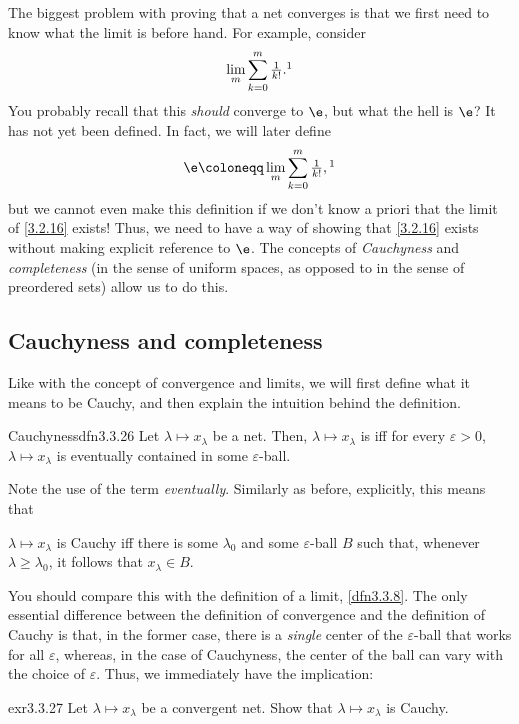 The biggest problem with proving that a net converges is that we first need to know what the limit is before hand.  For example, consider
\begin{equation}\label{3.2.16}
\lim _m\sum _{k=0}^m\tfrac{1}{k!}.\footnotemark
\end{equation}
You probably recall that this \emph{should} converge to $\e$, but what the hell is $\e$?  It has not yet been defined.  In fact, we will later define
\begin{equation}
\e \coloneqq \lim _m\sum _{k=0}^m\tfrac{1}{k!},\footnotemark
\end{equation}
but we cannot even make this definition if we don't know a priori that the limit of \eqref{3.2.16} exists!  Thus, we need to have a way of showing that \eqref{3.2.16} exists without making explicit reference to $\e$.  The concepts of \emph{Cauchyness} and \emph{completeness} (in the sense of uniform spaces, as opposed to in the sense of preordered sets) allow us to do this.

\subsection{Cauchyness and completeness}\label{sbs3.3.3}

Like with the concept of convergence and limits, we will first define what it means to be Cauchy, and then explain the intuition behind the definition.
\begin{dfn}{Cauchyness}{dfn3.3.26}
Let $\lambda \mapsto x_\lambda$ be a net.  Then, $\lambda \mapsto x_\lambda$ is  iff for every $\varepsilon >0$, $\lambda \mapsto x_\lambda$ is eventually contained in some $\varepsilon$-ball.
\begin{rmk}
Note the use of the term \emph{eventually}.  Similarly as before, explicitly, this means that
\begin{textequation}
$\lambda \mapsto x_\lambda$ is Cauchy iff there is some $\lambda _0$ and some $\varepsilon$-ball $B$ such that, whenever $\lambda \geq \lambda _0$, it follows that $x_\lambda \in B$.
\end{textequation}
\end{rmk}
\end{dfn}
You should compare this with the definition of a limit, \cref{dfn3.3.8}.  The only essential difference between the definition of convergence and the definition of Cauchy is that, in the former case, there is a \emph{single} center of the $\varepsilon$-ball that works for all $\varepsilon$, whereas, in the case of Cauchyness, the center of the ball can vary with the choice of $\varepsilon$.  Thus, we immediately have the implication:
\begin{exr}{}{exr3.3.27}
Let $\lambda \mapsto x_\lambda$ be a convergent net.  Show that $\lambda \mapsto x_\lambda$ is Cauchy.
\end{exr}

